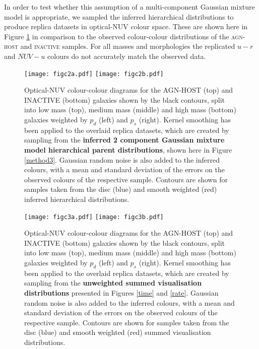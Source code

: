 \documentclass[useAMS,usenatbib]{mn2e}
\begin{document}
{In order to test whether this assumption of a multi-component Gaussian mixture model is appropriate, we sampled the inferred hierarchical distributions to produce replica datasets in optical-NUV colour space. These are shown here in Figure \ref{replica}  in comparison to the observed colour-colour distributions of the \textsc{agn-host} and \textsc{inactive} samples. For all masses and morphologies the replicated $u-r$ and $NUV-u$ colours do not accurately match the observed data. 

\begin{figure}
\begin{centering}
\texttt{[image: figc2a.pdf]}
\texttt{[image: figc2b.pdf]}
\caption[8pt]{Optical-NUV colour-colour diagrams for the \textsc{AGN-HOST} (top) and \textsc{INACTIVE} (bottom) galaxies shown by the black contours, split into low mass (top), medium mass (middle) and high mass (bottom) galaxies weighted by $p_d$ (left) and $p_s$ (right). Kernel smoothing has been applied to the overlaid replica datasets, which are created by sampling from the \textbf{inferred 2 component Gaussian mixture model hierarchical parent distributions}, shown here in Figure \ref{method3}. Gaussian random noise is also added to the inferred colours, with a mean and standard deviation of the errors on the observed colours of the respective sample. Contours are shown for samples taken from the disc (blue) and smooth weighted (red) inferred hierarchical distributions.
}
\label{replica}
\end{centering}
\end{figure}

\begin{figure}
\begin{centering}
\texttt{[image: figc3a.pdf]}
\texttt{[image: figc3b.pdf]}
\caption[8pt]{Optical-NUV colour-colour diagrams for the \textsc{AGN-HOST} (top) and \textsc{INACTIVE} (bottom) galaxies shown by the black contours, split into low mass (top), medium mass (middle) and high mass (bottom) galaxies weighted by $p_d$ (left) and $p_s$ (right). Kernel smoothing has been applied to the overlaid replica datasets, which are created by sampling from the \textbf{unweighted summed visualisation distributions} presented in Figures \ref{time} and \ref{rate}. Gaussian random noise is also added to the inferred colours, with a mean and standard deviation of the errors on the observed colours of the respective sample. Contours are shown for samples taken from the disc (blue) and smooth weighted (red) summed visualisation distributions.
}
\label{replicapop}
\end{centering}
\end{figure}

}
\end{document}
